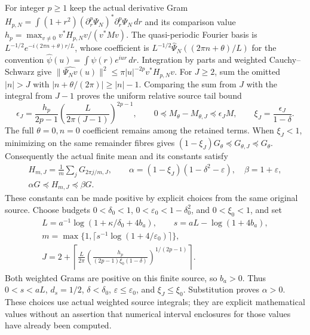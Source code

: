 \documentclass{article}
\begin{document}
For integer $p\ge1$ keep the actual derivative Gram
$H_{p,N}=\int(1+r^2)(\partial_r^p\Psi_N)^*
\partial_r^p\Psi_N\,dr$ and its comparison value
$h_p=\max_{v\ne0}v^*H_{p,N}v/(v^*Mv)$.
The quasi-periodic Fourier basis is
$L^{-1/2}e^{-i(2\pi n+\theta)r/L}$, whose coefficient is
$L^{-1/2}\widehat\Psi_N((2\pi n+\theta)/L)$ for the convention
$\widehat\psi(u)=\int\psi(r)e^{iur}\,dr$.
Integration by parts and weighted Cauchy--Schwarz give
$\|\widehat{\Psi_Nv}(u)\|^2\le\pi|u|^{-2p}v^*H_{p,N}v$.
For $J\ge2$, sum the omitted $|n|>J$ with
$|n+\theta/(2\pi)|\ge|n|-1$. Comparing the sum from $J$ with the
integral from $J-1$ proves the uniform relative source tail bound
\[
 \epsilon_J=\frac{h_p}{2p-1}
       \left(\frac{L}{2\pi(J-1)}\right)^{2p-1},\qquad
 0\preceq M_\theta-M_{\theta,J}\preceq\epsilon_J M,
 \qquad \xi_J=\frac{\epsilon_J}{1-\delta}.
 \tag{HG18}
\]
The full $\theta=0,n=0$ coefficient remains among the retained terms.
When $\xi_J<1$, minimizing on the same remainder fibres gives
$(1-\xi_J)G_\theta\preceq G_{\theta,J}\preceq G_\theta$.
Consequently the actual finite mean and its constants satisfy
\[
\begin{gathered}
 H_{m,J}=\frac1m\sum_jG_{2\pi j/m,J},\qquad
 \alpha=(1-\xi_J)(1-\delta^2-\varepsilon),\quad
 \beta=1+\varepsilon,\\
 \alpha G\preceq H_{m,J}\preceq\beta G .
\end{gathered}\tag{HG19}
\]
These constants can be made positive by explicit choices from the
same original source. Choose budgets $0<\delta_0<1$,
$0<\varepsilon_0<1-\delta_0^2$, and $0<\xi_0<1$, and set
\[
\begin{gathered}
 L=a^{-1}\log(1+\kappa/\delta_0+4b_a),\qquad
 s=aL-\log(1+4b_a),\\
 m=\max\{1,\lceil s^{-1}\log(1+4/\varepsilon_0)\rceil\},\\
 J=2+\left\lceil\frac{L}{2\pi}
 \left(\frac{h_p}{(2p-1)\xi_0(1-\delta)}
 \right)^{1/(2p-1)}\right\rceil .
\end{gathered}\tag{HG20}
\]
Both weighted Grams are positive on this finite source, so $b_a>0$.
Thus $0<s<aL$, $d_s=1/2$, $\delta<\delta_0$,
$\varepsilon\le\varepsilon_0$, and $\xi_J\le\xi_0$.
Substitution proves $\alpha>0$. These choices use actual weighted
source integrals; they are explicit mathematical values without an
assertion that numerical interval enclosures for those values have
already been computed.
\end{document}
